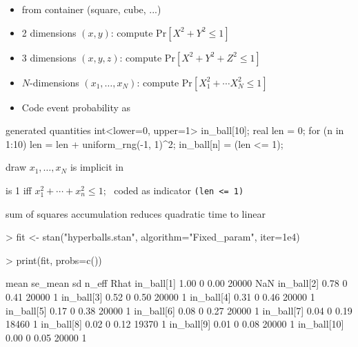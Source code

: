 \documentclass[10pt]{report}
\begin{document}
%
\begin{itemize}
\item {} from container (square, cube, ...)
\item 2 dimensions $(x, y)$: compute $\mbox{Pr}[X^2 + Y^2 \leq 1]$
\item 3 dimensions $(x, y, z)$: compute $\mbox{Pr}[X^2 + Y^2 + Z^2 \leq 1]$
\item $N$-dimensions $(x_1, \ldots, x_N)$: compute $\mbox{Pr}[X_1^2 +
  \cdots X_N^2 \leq 1]$
\item Code event probability as 
\end{itemize}

\vspace*{-8pt}
\begin{stancode}
generated quantities {
  int<lower=0, upper=1> in_ball[10];
  {
    real len = 0;
    for (n in 1:10) {
      len = len + uniform_rng(-1, 1)^2;
      in_ball[n] = (len <= 1);
    }
  }
}
\end{stancode}
%
\begin{subitemize}
\item draw $x_1, \ldots, x_N$ is implicit in 
\item {} is 1 iff $x_1^2 + \cdots + x_n^2 \leq 1$; \
  coded as indicator \Verb|(len <= 1)|
\item sum of squares accumulation reduces quadratic time to linear
\end{subitemize}

\begin{stancode}
> fit <- stan("hyperballs.stan", algorithm="Fixed_param",
              iter=1e4)

> print(fit, probs=c())

            mean se_mean   sd n_eff Rhat
in_ball[1]  1.00       0 0.00 20000  NaN
in_ball[2]  0.78       0 0.41 20000    1
in_ball[3]  0.52       0 0.50 20000    1
in_ball[4]  0.31       0 0.46 20000    1
in_ball[5]  0.17       0 0.38 20000    1
in_ball[6]  0.08       0 0.27 20000    1
in_ball[7]  0.04       0 0.19 18460    1
in_ball[8]  0.02       0 0.12 19370    1
in_ball[9]  0.01       0 0.08 20000    1
in_ball[10] 0.00       0 0.05 20000    1
\end{stancode}
\end{document}
